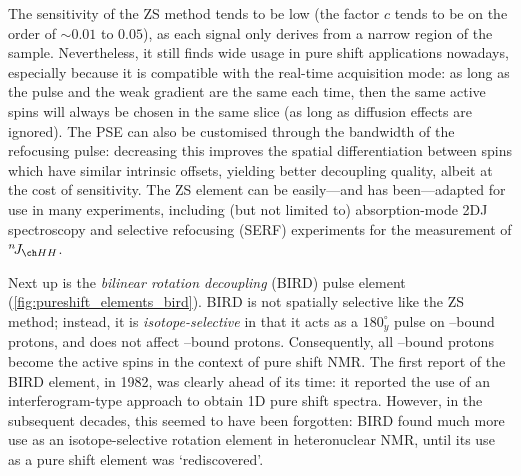 The sensitivity of the ZS method tends to be low (the factor $c$ tends to be on the order of $\sim 0.01$ to $0.05$), as each signal only derives from a narrow region of the sample.
Nevertheless, it still finds wide usage in pure shift applications nowadays, especially because it is compatible with the real-time acquisition mode\autocite{Meyer2013ACIE}: as long as the pulse and the weak gradient are the same each time, then the same active spins will always be chosen in the same slice (as long as diffusion effects are ignored).
The PSE can also be customised through the bandwidth of the refocusing pulse: decreasing this improves the spatial differentiation between spins which have similar intrinsic offsets, yielding better decoupling quality, albeit at the cost of sensitivity.
The ZS element can be easily---and has been---adapted for use in many experiments, including (but not limited to) absorption-mode 2DJ spectroscopy\autocite{Pell2007JMR} and selective refocusing (SERF) experiments for the measurement of $\nJ{HH}$\autocite{Giraud2010ACIE,Gubensak2014CC,Mishra2017JMR,Buchberger2018MRC}.

Next up is the \textit{bilinear rotation decoupling} (BIRD) pulse element (\cref{fig:pureshift_elements_bird}).
BIRD is not spatially selective like the ZS method; instead, it is \textit{isotope-selective} in that it acts as a $180^\circ_y$ pulse on \carbon{}--bound protons, and does not affect \carbont{}--bound protons.
Consequently, all \carbon{}--bound protons become the active spins in the context of pure shift NMR.
The first report of the BIRD element\autocite{Garbow1982CPL}, in 1982, was clearly ahead of its time: it reported the use of an interferogram-type approach to obtain 1D pure shift spectra.
However, in the subsequent decades, this seemed to have been forgotten: BIRD found much more use as an isotope-selective rotation element in heteronuclear NMR\autocite{Uhrin1993JMRSA}, until its use as a pure shift element was `rediscovered'\autocite{Sakhaii2009JMR,Aguilar2011ACIE}.

